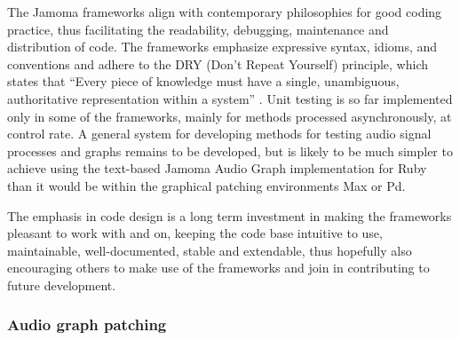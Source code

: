 \documentclass[twoside,a4paper]{article}
\begin{document}
The Jamoma frameworks align with contemporary philosophies for good coding practice, thus facilitating the readability, debugging, maintenance and distribution of code.
The frameworks emphasize expressive syntax, idioms, and conventions \cite{Martin:2009} and adhere to the DRY (Don't Repeat Yourself) principle, which states that ``Every piece of knowledge must have a single, unambiguous, authoritative representation within a system'' \cite{Hunt:1999}.
Unit testing  \cite{Martin:2009} is so far implemented only in some of the frameworks, mainly for methods processed asynchronously, at control rate.
A general system for developing methods for testing audio signal processes and graphs remains to be developed, but is likely to be much simpler to achieve using the text-based Jamoma Audio Graph implementation for Ruby than it would be within the graphical patching environments Max or Pd.

The emphasis in code design is a long term investment in making the frameworks pleasant to work with and on, keeping the code base intuitive to use, maintainable, well-documented, stable and extendable, thus hopefully also encouraging others to make use of the frameworks and join in contributing to future development.



%
%
%


\subsubsection{Audio graph patching} %
\end{document}
